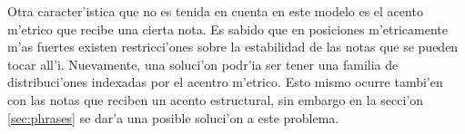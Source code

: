 Otra caracter'istica que no es tenida en cuenta en este modelo es el acento m'etrico que recibe una cierta nota. Es sabido que en posiciones m'etricamente m'as fuertes
existen restricci'ones sobre la estabilidad de las notas que se pueden tocar all'i. Nuevamente, una soluci'on podr'ia ser tener una familia de distribuci'ones indexadas
por el acentro m'etrico. Esto mismo ocurre tambi'en con las notas que reciben un acento estructural, sin embargo en la secci'on \ref{sec:phrases} se dar'a una posible
soluci'on a este problema. 


